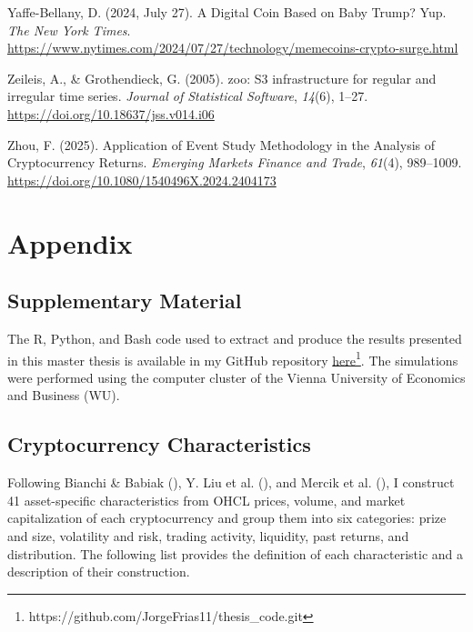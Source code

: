 \documentclass[
  12pt,
  a4paper,
  openany]{scrbook}
\newlength{\cslhangindent}
\newenvironment{CSLReferences}[2] %
 {\begin{list}{}{%
  \setlength{\itemindent}{0pt}
  \setlength{\leftmargin}{0pt}
  \setlength{\parsep}{0pt}
  \ifodd #1
   \setlength{\leftmargin}{\cslhangindent}
   \setlength{\itemindent}{-1\cslhangindent}
  \fi
  \setlength{\itemsep}{#2\baselineskip}}}
 {\end{list}}
\begin{document}
\begin{CSLReferences}{1}{0}
Yaffe-Bellany, D. (2024, July 27). A Digital Coin Based on Baby Trump?
Yup. \emph{The New York Times}.
\url{https://www.nytimes.com/2024/07/27/technology/memecoins-crypto-surge.html}

Zeileis, A., \& Grothendieck, G. (2005). {zoo}: S3 infrastructure for
regular and irregular time series. \emph{Journal of Statistical
Software}, \emph{14}(6), 1--27.
\url{https://doi.org/10.18637/jss.v014.i06}

Zhou, F. (2025). Application of Event Study Methodology in the Analysis
of Cryptocurrency Returns. \emph{Emerging Markets Finance and Trade},
\emph{61}(4), 989--1009.
\url{https://doi.org/10.1080/1540496X.2024.2404173}

\end{CSLReferences}

\cleardoublepage
{}
{}
\appendix

\chapter{Appendix}\label{appendix}

\section{Supplementary Material}\label{sec-app_material}

The R, Python, and Bash code used to extract and produce the results
presented in this master thesis is available in my GitHub repository
\href{https://github.com/JorgeFrias11/thesis_code.git}{here}\footnote{https://github.com/JorgeFrias11/thesis\_code.git}.
The simulations were performed using the computer cluster of the Vienna
University of Economics and Business (WU).

\section{Cryptocurrency Characteristics}\label{sec-app_characteristics}

Following Bianchi \& Babiak
(), Y. Liu et
al. (), and Mercik et al.
(),
I construct 41 asset-specific characteristics from OHCL prices, volume,
and market capitalization of each cryptocurrency and group them into six
categories: prize and size, volatility and risk, trading activity,
liquidity, past returns, and distribution. The following list provides
the definition of each characteristic and a description of their
construction.
\end{document}
